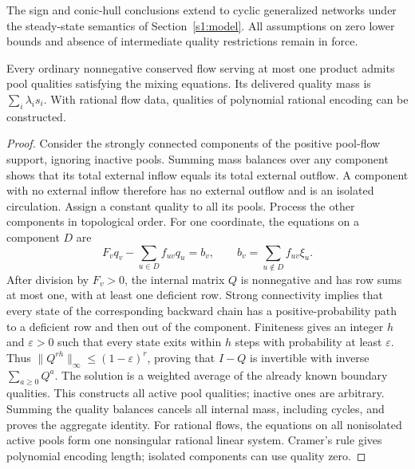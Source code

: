 The sign and conic-hull conclusions extend to cyclic generalized
networks under the steady-state semantics of
Section~\ref{s1:model}. All assumptions on zero lower bounds and
absence of intermediate quality restrictions remain in force.

\begin{lemma}\label{s1:cyclic-single}
Every ordinary nonnegative conserved flow serving at most one product
admits pool qualities satisfying the mixing equations. Its delivered
quality mass is $\sum_i\lambda_is_i$. With rational flow data,
qualities of polynomial rational encoding can be constructed.
\end{lemma}
\begin{proof}
Consider the strongly connected components of the positive pool-flow
support, ignoring inactive pools. Summing mass balances over any
component shows that its total external inflow equals its total external
outflow. A component with no external inflow therefore has no external
outflow and is an isolated circulation. Assign a constant quality to
all its pools. Process the other components in topological order.
For one coordinate, the equations on a component $D$ are
\[
 F_vq_v-\sum_{u\in D}f_{uv}q_u=b_v,\qquad
 b_v=\sum_{u\notin D}f_{uv}\xi_u.
\]
After division by $F_v>0$, the internal matrix $Q$ is nonnegative and
has row sums at most one, with at least one deficient row. Strong
connectivity implies that every state of the corresponding backward
chain has a positive-probability path to a deficient row and then out
of the component. Finiteness gives an integer $h$ and $\varepsilon>0$
such that every state exits within $h$ steps with probability at least
$\varepsilon$. Thus $\|Q^{rh}\|_\infty\le(1-\varepsilon)^r$, proving
that $I-Q$ is invertible with inverse $\sum_{a\ge0}Q^a$.
The solution is a weighted average of the already known boundary
qualities. This constructs all active pool qualities; inactive ones
are arbitrary. Summing the quality balances cancels all internal mass,
including cycles, and proves the aggregate identity.
For rational flows, the equations on all nonisolated active pools form
one nonsingular rational linear system. Cramer's rule gives polynomial
encoding length; isolated components can use quality zero.
\end{proof}

